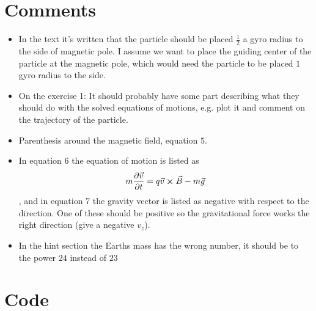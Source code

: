 \documentclass[x11names]{article}
\renewcommand{\va}{\vec}
\begin{document}
\appendix

\section{Comments}
  \begin{itemize}
    \item In the text it's written that the particle should be placed \(\frac{1}{2}\) a gyro radius to the side of magnetic pole. I assume we want to place the guiding center of the particle at the magnetic pole, which would need the particle to be placed \(1\) gyro radius to the side.
    \item On the exercise 1: It should probably have some part describing what they should do with the solved equations of motions, e.g. plot it and comment on the trajectory of the particle.
    \item Parenthesis around the magnetic field, equation \(5\).
    \item In equation \(6\) the equation of motion is listed as 
    \[m\pdv{\va{v}}{t} = q\va{v} \cross \va{B} - m \va{g}\]
    , and in equation \(7\) the gravity vector is listed as negative with respect to the direction.
    One of these should be positive so the gravitational force works the right direction (give a negative \(v_z\)).
    \item In the hint section the Earths mass has the wrong number, it should be to the power \(24\) instead of \(23\)
  \end{itemize}

\section{Code}
  \label{sec:code}
  
\end{document}
